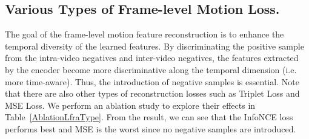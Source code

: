 \documentclass[sigconf,screen]{acmart}
\begin{document}
\begin{table}[htbp]
\normalsize
\renewcommand\arraystretch{1.1}
\setlength{\tabcolsep}{15mm}
\centering
\caption{Ablation study on the various type of $\mathcal{L}_{\mathrm{Fra}}$.}
\label{AblationLfraType}
\end{table}

\subsection{Various Types of Frame-level Motion Loss.} 
The goal of the frame-level motion feature reconstruction is to enhance the temporal diversity of the learned features. By discriminating the positive sample from the intra-video negatives and inter-video negatives, the features extracted by the encoder become more discriminative along the temporal dimension (i.e. more time-aware). Thus, the introduction of negative samples is essential. Note that there are also other types of reconstruction losses such as Triplet Loss and MSE Loss. We perform an ablation study to explore their effects in Table~\ref{AblationLfraType}. From the result, we can see that the InfoNCE loss performs best and MSE is the worst since no negative samples are introduced.

\begin{table}[htbp]
\normalsize
\renewcommand\arraystretch{1.1}
\setlength{\tabcolsep}{7mm}
\centering
\caption{Ablation study on the number of negative samples in $\mathcal{L}_{\mathrm{Fra}}$.}
\label{AblationNumNegative}
\end{table}
\end{document}
